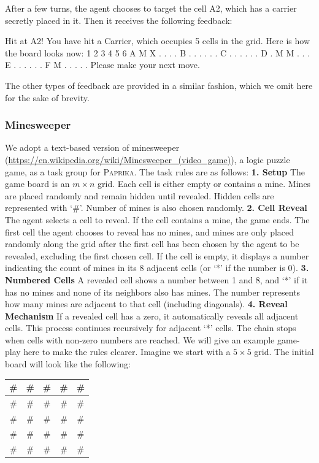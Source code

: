 \documentclass{article}
\newcommand{\ours}[1]{\textsc{Paprika}}
\theoremstyle{plain}
\theoremstyle{definition}
\theoremstyle{remark}
\begin{document}
After a few turns, the agent chooses to target the cell A2, which has a carrier secretly placed in it. Then it receives the following feedback:
\begin{tcolorbox}[colback=gray!20, colframe=black, title=Battleship Environment Feedback Example 2]
Hit at A2! You have hit a Carrier, which occupies 5 cells in the grid.
Here is how the board looks now:
1  2  3  4  5  6
A   M  X  .  .  .  .
B   .  .  .  .  .  .
C   .  .  .  .  .  .
D   .  M  M  .  .  .
E   .  .  .  .  .  .
F   M  .  .  .  .  .
Please make your next move.
\end{tcolorbox}
The other types of feedback are provided in a similar fashion, which we omit here for the sake of brevity.
\newpage
\subsubsection{Minesweeper}
We adopt a text-based version of minesweeper (\url{https://en.wikipedia.org/wiki/Minesweeper_(video_game)}), a logic puzzle game, as a task group for \ours{}. The task rules are as follows:
\textbf{1. Setup}
The game board is an $m \times n$ grid. Each cell is either empty or contains a mine. Mines are placed randomly and remain hidden until revealed. Hidden cells are represented with `\#'. Number of mines is also chosen randomly.
\textbf{2. Cell Reveal}
The agent selects a cell to reveal. If the cell contains a mine, the game ends. The first cell the agent chooses to reveal has no mines, and mines are only placed randomly along the grid after the first cell has been chosen by the agent to be revealed, excluding the first chosen cell. If the cell is empty, it displays a number indicating the count of mines in its 8 adjacent cells (or `*' if the number is 0).
\textbf{3. Numbered Cells}
A revealed cell shows a number between 1 and 8, and `*' if it has no mines and none of its neighbors also has mines. The number represents how many mines are adjacent to that cell (including diagonals).
\textbf{4. Reveal Mechanism}
If a revealed cell has a zero, it automatically reveals all adjacent cells. This process continues recursively for adjacent `*' cells. The chain stops when cells with non-zero numbers are reached.
We will give an example game-play here to make the rules clearer. Imagine we start with a $5 \times 5$ grid. The initial board will look like the following:
\begin{table}[h]
\centering
\begin{tabular}{|c|c|c|c|c|}
\hline
\# & \# & \# & \# & \# \\
\hline
\# & \# & \# & \# & \# \\
\hline
\# & \# & \# & \# & \# \\
\hline
\# & \# & \# & \# & \# \\
\hline
\# & \# & \# & \# & \# \\
\hline
\end{tabular}
\end{table}
\end{document}
